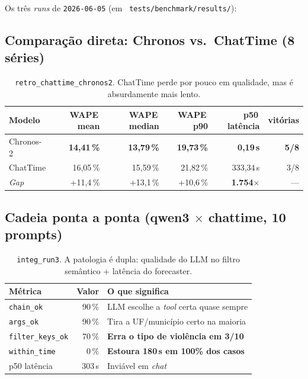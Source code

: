 \documentclass[11pt,a4paper]{article}
\newcommand{\code}[1]{\texttt{\small #1}}
\newcommand{\file}[1]{\texttt{\small\color{black!75} #1}}
\begin{document}
Os três \emph{runs} de \code{2026-06-05} (em
\file{tests/benchmark/results/}):

\subsection{Comparação direta: Chronos vs.\ ChatTime (8 séries)}

\begin{table}[h!]
\centering
\small
\begin{tabular}{@{}l r r r r r@{}}
\toprule
\textbf{Modelo} & \textbf{WAPE\,mean} & \textbf{WAPE\,median} & \textbf{WAPE\,p90}
                & \textbf{p50\,latência} & \textbf{vitórias} \\
\midrule
Chronos-2 & \textbf{14,41\,\%} & \textbf{13,79\,\%} & \textbf{19,73\,\%} & \textbf{0,19\,s} & \textbf{5/8} \\
ChatTime  & 16,05\,\%          & 15,59\,\%          & 21,82\,\%          & 333,34\,s        & 3/8 \\
\midrule
\emph{Gap} & +11,4\,\%        & +13,1\,\%          & +10,6\,\%          & \textbf{1.754$\times$} & --- \\
\bottomrule
\end{tabular}
\caption{\code{retro\_chattime\_chronos2}. ChatTime perde por pouco em
qualidade, mas é absurdamente mais lento.}
\end{table}

\subsection{Cadeia ponta a ponta (qwen3 $\times$ chattime, 10 prompts)}

\begin{table}[h!]
\centering
\small
\begin{tabular}{@{}l r l@{}}
\toprule
\textbf{Métrica} & \textbf{Valor} & \textbf{O que significa} \\
\midrule
\code{chain\_ok}        &  90\,\%  & LLM escolhe a \emph{tool} certa quase sempre \\
\code{args\_ok}         &  90\,\%  & Tira a UF/município certo na maioria \\
\code{filter\_keys\_ok} &  70\,\%  & \textbf{Erra o tipo de violência em 3/10} \\
\code{within\_time}     &   0\,\%  & \textbf{Estoura 180\,s em 100\% dos casos} \\
p50 latência            & 303\,s   & Inviável em \emph{chat} \\
\bottomrule
\end{tabular}
\caption{\code{integ\_run3}. A patologia é dupla: qualidade do LLM no
filtro semântico + latência do forecaster.}
\end{table}
\end{document}
